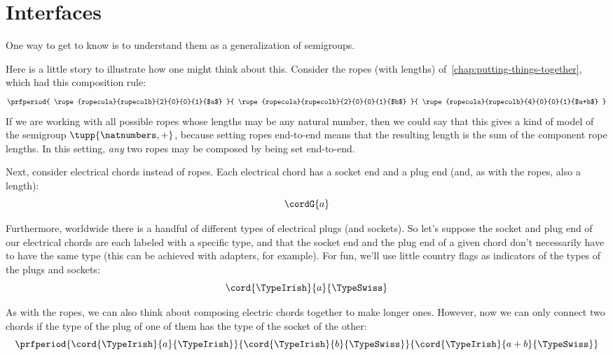 
\section{Interfaces}\label{sec:interfaces}

One way to get to know   is to understand them as a generalization of semigroups. 

Here is a little story to illustrate how one might think about this. Consider the ropes (with lengths) of~\cref{chap:putting-things-together}, which had this composition rule:
%
\begin{equation}
    \prfperiod{
        \rope{ropecola}{ropecolb}{2}{0}{0}{1}{$a$}
    }{
        \rope{ropecola}{ropecolb}{2}{0}{0}{1}{$b$}
    }{
        \rope{ropecola}{ropecolb}{4}{0}{0}{1}{$a+b$}
    }
\end{equation}
%
If we are working with all possible ropes whose lengths may be any natural number, then we could say that this gives a kind of model of the semigroup $\tupp{\natnumbers,+}$, because setting ropes end-to-end means that the resulting length is the sum of the component rope lengths. In this setting, \emph{any} two ropes may be composed by being set end-to-end. 

Next, consider electrical chords instead of ropes. Each electrical chord has a socket end and a plug end (and, as with the ropes, also a length):
\begin{equation}
\cordG{a}
\end{equation}

Furthermore, worldwide there is a handful of different types of electrical plugs (and sockets). So let's suppose the socket and plug end of our electrical chords are each labeled with a specific type, and that the socket end and the plug end of a given chord don't necessarily have to have the same type (this can be achieved with adapters, for example). For fun, we'll use little country flags as indicators of the types of the plugs and sockets: 
\begin{equation}
    \label{eq:want}
    {\cord{\TypeIrish}{a}{\TypeSwiss}}
\end{equation}

As with the ropes, we can also think about composing electric chords together to make longer ones. However, now we can only connect two chords if the type of the plug of one of them has the type of the socket of the other:
\begin{equation}
    \label{eq:irish-swiss-result}
    \prfperiod{
        \cord{\TypeIrish}{a}{\TypeIrish}
    }{
        \cord{\TypeIrish}{b}{\TypeSwiss}
    }{
        \cord{\TypeIrish}{a + b}{\TypeSwiss}
    }
\end{equation}

